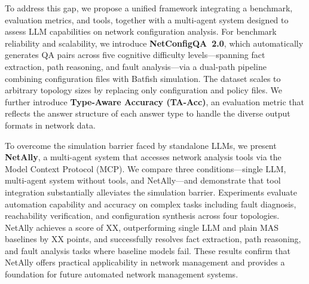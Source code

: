 To address this gap, we propose a unified framework integrating a benchmark, evaluation metrics, and tools, together with a multi-agent system designed to assess LLM capabilities on network configuration analysis.
For benchmark reliability and scalability, we introduce \textbf{NetConfigQA~2.0}, which automatically generates QA pairs across five cognitive difficulty levels---spanning fact extraction, path reasoning, and fault analysis---via a dual-path pipeline combining configuration files with Batfish simulation.
The dataset scales to arbitrary topology sizes by replacing only configuration and policy files.
We further introduce \textbf{Type-Aware Accuracy (TA-Acc)}, an evaluation metric that reflects the answer structure of each answer type to handle the diverse output formats in network data.

To overcome the simulation barrier faced by standalone LLMs, we present \textbf{NetAlly}, a multi-agent system that accesses network analysis tools via the Model Context Protocol (MCP).
We compare three conditions---single LLM, multi-agent system without tools, and NetAlly---and demonstrate that tool integration substantially alleviates the simulation barrier.
Experiments evaluate automation capability and accuracy on complex tasks including fault diagnosis, reachability verification, and configuration synthesis across four topologies.
NetAlly achieves a score of XX, outperforming single LLM and plain MAS baselines by XX points, and successfully resolves fact extraction, path reasoning, and fault analysis tasks where baseline models fail.
These results confirm that NetAlly offers practical applicability in network management and provides a foundation for future automated network management systems.